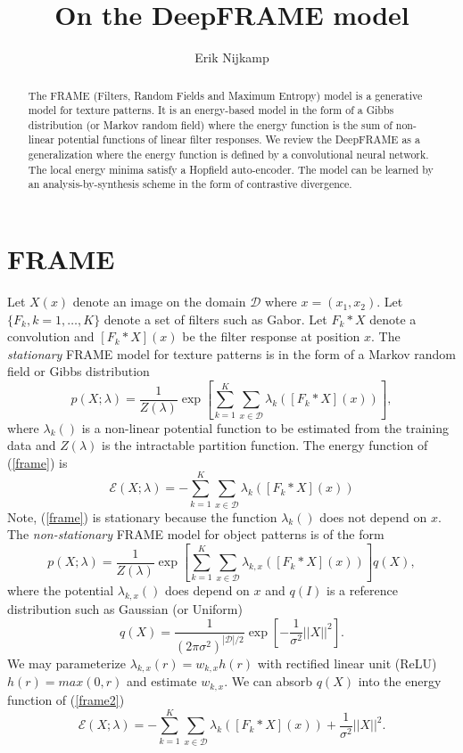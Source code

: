\documentclass[11pt]{article}
\def\D{\mathcal{D}}
\def\En{\mathcal{E}}
\def\I{X}
\begin{document}
	
\title{On the DeepFRAME model}
\author{Erik Nijkamp}
\date{}
\maketitle

\begin{abstract}
The FRAME (Filters, Random Fields and Maximum Entropy) model \citep{ZhuWM97} is a generative model for texture patterns. It is an energy-based model in the form of a Gibbs distribution (or Markov random field) where the energy function is the sum of non-linear potential functions of linear filter responses. We review the DeepFRAME  as a generalization where the energy function is defined by a convolutional neural network. The local energy minima satisfy a Hopfield auto-encoder. The model can be learned by an analysis-by-synthesis scheme in the form of contrastive divergence.
\end{abstract}

\section{FRAME}
Let $\I(x)$ denote an image on the domain $\D$ where $x=(x_1,x_2)$. Let $\{F_k,k=1,\ldots,K\}$ denote a set of filters such as Gabor. Let $F_k*\I$ denote a convolution and $[F_k*\I](x)$ be the filter response at position $x$.
The \textit{stationary} FRAME model for texture patterns is in the form of a Markov random field or Gibbs distribution
\begin{equation}
p(\I;\lambda)=\frac{1}{Z(\lambda)}\exp\left[ \sum_{k=1}^K \sum_{x\in\D}\lambda_k([F_k*\I](x)) \right],\label{frame}
\end{equation}
where $\lambda_k()$ is a non-linear potential function to be estimated from the training data and $Z(\lambda)$ is the intractable partition function. The energy function of (\ref{frame}) is 
\begin{equation}
\En(\I;\lambda)=-\sum_{k=1}^K \sum_{x\in\D}\lambda_k([F_k*\I](x))
\end{equation}
Note, (\ref{frame}) is stationary because the function $\lambda_k()$ does not depend on $x$.
The \textit{non-stationary} FRAME model for object patterns is of the form
\begin{equation}
p(\I;\lambda)=\frac{1}{Z(\lambda)}\exp\left[ \sum_{k=1}^K \sum_{x\in\D}\lambda_{k,x}([F_k*\I](x)) \right]q(\I),\label{frame2}
\end{equation}
where the potential $\lambda_{k,x}()$ does depend on $x$ and $q(I)$ is a reference distribution such as Gaussian (or Uniform)
\begin{equation}
q(\I)=\frac{1}{(2\pi\sigma^2)^{|\D|/2}}\exp\left[ -\frac{1}{\sigma^2} || \I ||^2 \right].\label{prior}
\end{equation}
We may parameterize $\lambda_{k,x}(r)=w_{k,x}h(r)$ with rectified linear unit (ReLU) $h(r) = max(0,r)$ and estimate $w_{k,x}$. We can absorb $q(\I)$ into the energy function of (\ref{frame2})
\begin{equation}
\En(\I;\lambda)=-\sum_{k=1}^K \sum_{x\in\D}\lambda_k([F_k*\I](x))+\frac{1}{\sigma^2} || \I ||^2.
\end{equation}
\end{document}
